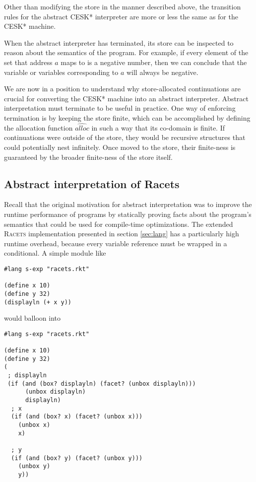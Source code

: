 \documentclass{article}
\begin{document}
Other than modifying the store in the manner described above, the transition rules for the abstract CESK* interpreter are more or less the same as for the CESK* machine.

When the abstract interpreter has terminated, its store can be inspected to reason about the semantics of the program. For example, if every element of the set that address $a$ maps to is a negative number, then we can conclude that the variable or variables corresponding to $a$ will always be negative.

We are now in a position to understand why store-allocated continuations are crucial for converting the CESK* machine into an abstract interpreter. Abstract interpretation must terminate to be useful in practice. One way of enforcing termination is by keeping the store finite, which can be accomplished by defining the allocation function $\widehat{alloc}$ in such a way that its co-domain is finite. If continuations were outside of the store, they would be recursive structures that could potentially nest infinitely. Once moved to the store, their finite-ness is guaranteed by the broader finite-ness of the store itself.


\subsection{Abstract interpretation of Racets}
Recall that the original motivation for abstract interpretation was to improve the runtime performance of programs by statically proving facts about the program's semantics that could be used for compile-time optimizations. The extended \textsc{Racets} implementation presented in section \ref{sec:lang} has a particularly high runtime overhead, because every variable reference must be wrapped in a conditional. A simple module like

\begin{lstlisting}
#lang s-exp "racets.rkt"

(define x 10)
(define y 32)
(displayln (+ x y))
\end{lstlisting}

\noindent would balloon into

\begin{lstlisting}
#lang s-exp "racets.rkt"

(define x 10)
(define y 32)
(
 ; displayln
 (if (and (box? displayln) (facet? (unbox displayln)))
      (unbox displayln)
      displayln)
  ; x
  (if (and (box? x) (facet? (unbox x)))
    (unbox x)
    x)

  ; y
  (if (and (box? y) (facet? (unbox y)))
    (unbox y)
    y))
\end{lstlisting}
\end{document}
